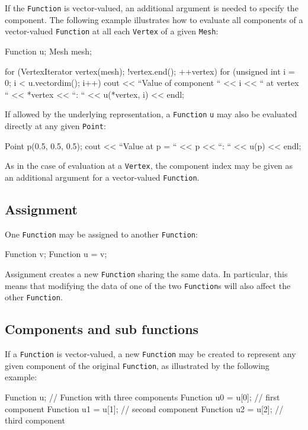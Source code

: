 If the \texttt{Function} is vector-valued, an additional argument is
needed to specify the component.  The following example illustrates
how to evaluate all components of a vector-valued \texttt{Function}
at all each \texttt{Vertex} of a given \texttt{Mesh}:
\begin{code}
  Function u;
  Mesh mesh;

  for (VertexIterator vertex(mesh); !vertex.end(); ++vertex)
    for (unsigned int i = 0; i < u.vectordim(); i++)
      cout << ``Value of component `` << i << `` at vertex ``
           << *vertex << ``: `` << u(*vertex, i) << endl;
\end{code}

If allowed by the underlying representation, a \texttt{Function}
\texttt{u} may also be evaluated directly at any given \texttt{Point}:
\begin{code}
  Point p(0.5, 0.5, 0.5);
  cout << ``Value at p = `` << p << ``: `` << u(p) << endl;
\end{code}
As in the case of evaluation at a \texttt{Vertex}, the component index
may be given as an additional argument for a vector-valued \texttt{Function}.

\subsection{Assignment}

One \texttt{Function} may be assigned to another \texttt{Function}:
\begin{code}
  Function v;
  Function u = v;
\end{code}
Assignment creates a new \texttt{Function} sharing the same data.  In
particular, this means that modifying the data of one of the two
\texttt{Function}s will also affect the other \texttt{Function}.

\subsection{Components and sub functions}

If a \texttt{Function} is vector-valued, a new \texttt{Function} may be
created to represent any given component of the original \texttt{Function},
as illustrated by the following example:
\begin{code}
  Function u;         // Function with three components
  Function u0 = u[0]; // first component
  Function u1 = u[1]; // second component
  Function u2 = u[2]; // third component
\end{code}

